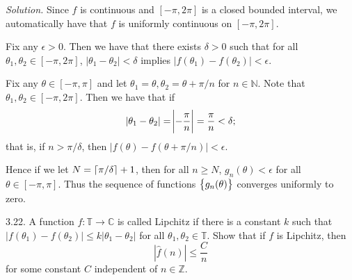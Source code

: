 \documentclass{article}
\DeclarePairedDelimiter\ceil{\lceil}{\rceil}
\newcommand{\C}{\mathbb{C}}
\newcommand{\T}{\mathbb{T}}
\newcommand{\N}{\mathbb{N}}
\newcommand{\Z}{\mathbb{Z}}
\begin{document}
\textit{Solution.}
Since $f$ is continuous and $[-\pi, 2\pi]$ is a closed bounded interval,
we automatically have that $f$ is uniformly continuous on $[-\pi, 2\pi]$.

Fix any $\epsilon > 0$. Then we have that there exists $\delta > 0$ such
that for all $\theta_1, \theta_2 \in [-\pi, 2 \pi]$,
$|\theta_1 - \theta_2| < \delta$ implies $|f(\theta_1) - f(\theta_2)| < \epsilon$.

Fix any $\theta \in [-\pi, \pi]$ and let
$\theta_1 = \theta, \theta_2 = \theta + \pi / n$ for $n \in \N$. Note
that $\theta_1, \theta_2 \in [-\pi, 2 \pi]$. Then we have that if
%
\begin{equation*}
    |\theta_1 - \theta_2| = \envert{-\frac{\pi}{n}} = \frac{\pi}{n} < \delta
    ;
\end{equation*}
%
that is, if $n > \pi / \delta$, then
$|f(\theta) - f(\theta + \pi/n)| < \epsilon$.

Hence if we let $N = \ceil{\pi / \delta} + 1$, then for all $n \geq N$,
$g_n(\theta) < \epsilon$ for all $\theta \in [-\pi, \pi]$. Thus the
sequence of functions $\cbr{g_n(\theta)}$ converges uniformly to zero.

\newpage

3.22. A function $f: \T \to \C$ is called Lipchitz if there is a constant $k$ such that
$|f(\theta_1) - f(\theta_2)| \leq k |\theta_1 - \theta_2|$ for all
$\theta_1, \theta_2 \in \T$. Show that if $f$ is Lipchitz, then
%
\begin{equation*}
    |\widehat{f}(n)| \leq \frac{C}{n}
\end{equation*}
%
for some constant $C$ independent of $n \in \Z$.
\end{document}

